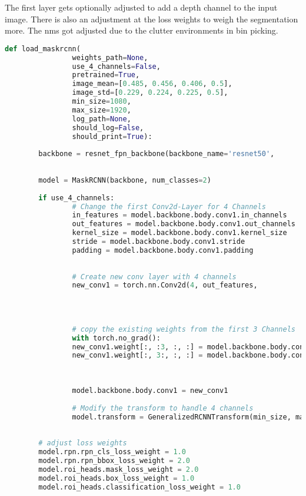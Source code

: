 		The first layer gets optionally adjusted to add a depth channel to the input image. There is also an adjustment at the loss weights to weigh the segmentation more. The \acl{nms} got adjusted due to the clutter environments in bin picking.\\ %
		\iffalse
		\begin{lstlisting}[language=Python,caption=Loading function of Mask R-CNN using torchvision, label=lst:model-loading]
def load_maskrcnn(
				weights_path=None, 
				use_4_channels=False, 
				pretrained=True,
				image_mean=[0.485, 0.456, 0.406, 0.5], 
				image_std=[0.229, 0.224, 0.225, 0.5],    
				min_size=1080, 
				max_size=1920, 
				log_path=None, 
				should_log=False, 
				should_print=True):
		
		backbone = resnet_fpn_backbone(backbone_name='resnet50',
																			weights=ResNet50_Weights.IMAGENET1K_V2
																			) 
		model = MaskRCNN(backbone, num_classes=2)  
		
		if use_4_channels:
				# Change the first Conv2d-Layer for 4 Channels
				in_features = model.backbone.body.conv1.in_channels    
				out_features = model.backbone.body.conv1.out_channels
				kernel_size = model.backbone.body.conv1.kernel_size
				stride = model.backbone.body.conv1.stride
				padding = model.backbone.body.conv1.padding
				
				
				# Create new conv layer with 4 channels
				new_conv1 = torch.nn.Conv2d(4, out_features,
																				kernel_size=kernel_size, 
																				stride=stride, 
																				padding=padding)
				
				# copy the existing weights from the first 3 Channels
				with torch.no_grad():
				new_conv1.weight[:, :3, :, :] = model.backbone.body.conv1.weight  # Copy old 3 Channels
				new_conv1.weight[:, 3:, :, :] = model.backbone.body.conv1.weight
																														[:, :1, :, :]
				
				
				model.backbone.body.conv1 = new_conv1
				
				# Modify the transform to handle 4 channels
				model.transform = GeneralizedRCNNTransform(min_size, max_size, 
																										image_mean, image_std)
		
		# adjust loss weights
		model.rpn.rpn_cls_loss_weight = 1.0
		model.rpn.rpn_bbox_loss_weight = 2.0
		model.roi_heads.mask_loss_weight = 2.0
		model.roi_heads.box_loss_weight = 1.0
		model.roi_heads.classification_loss_weight = 1.0
		

\end{lstlisting}
